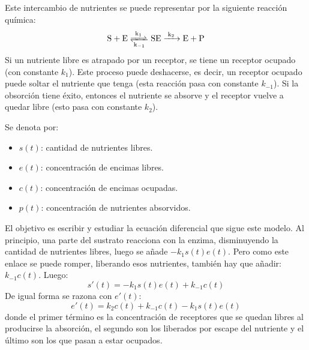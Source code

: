 Este intercambio de nutrientes se puede representar por la siguiente reacción química:
\[
\ce{S + E <=>[k_1][k_{-1}] SE ->[k_2] E + P } 
\]
Si un nutriente libre es atrapado por un receptor, se tiene un receptor ocupado (con constante $k_1$). Este proceso puede deshacerse, es decir, un receptor ocupado puede soltar el nutriente que tenga (esta reacción pasa con constante $k_{-1}$). Si la obsorción tiene éxito, entonces el nutriente se absorve y el receptor vuelve a quedar libre (esto pasa con constante $k_2$). 

Se denota por:
\begin{itemize}
\item $s(t)$: cantidad de nutrientes libres.
\item $e(t)$: concentración de encimas libres.
\item $c(t)$: concentración de encimas ocupadas.
\item $p(t)$: concentración de nutrientes absorvidos.
\end{itemize}

El objetivo es escribir y estudiar la ecuación diferencial que sigue este modelo. Al principio, una parte del sustrato reacciona con la enzima, disminuyendo la cantidad de nutrientes libres, luego se añade $-k_1s(t)e(t)$. Pero como este enlace se puede romper, liberando esos nutrientes, también hay que añadir: $k_{-1}c(t)$. Luego:
\[
s'(t)=-k_1s(t)e(t)+k_{-1}c(t)
\]
De igual forma se razona con $e'(t)$:
\[
e'(t)=k_2c(t)+k_{-1}c(t)-k_1s(t)e(t)
\]
donde el primer término es la concentración de receptores que se quedan libres al producirse la absorción, el segundo son los liberados por escape del nutriente y el último son los que pasan a estar ocupados.

